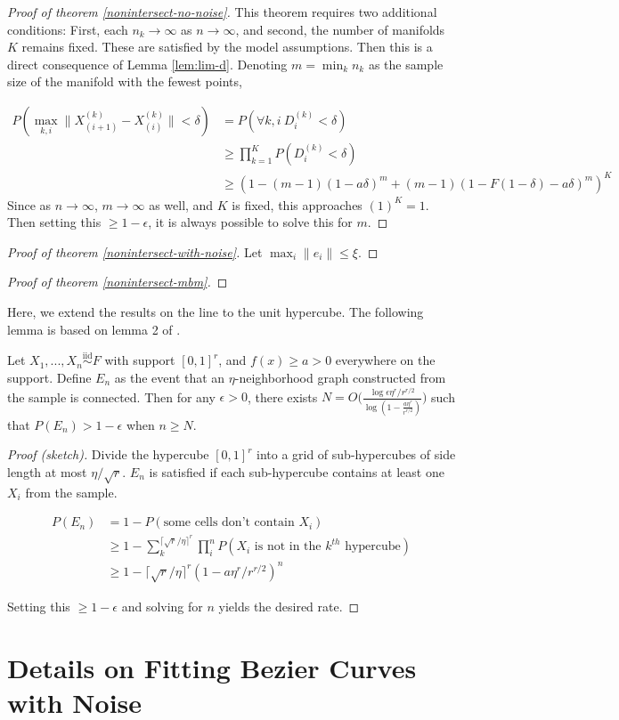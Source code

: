 \documentclass[12pt]{article}
\begin{document}
\begin{proof}[Proof of theorem \ref{nonintersect-no-noise}]
This theorem requires two additional conditions: 
First, each $n_k \to \infty$ as $n \to \infty$, and second, the number of manifolds $K$ remains fixed. 
These are satisfied by the model assumptions. 
Then this is a direct consequence of Lemma \ref{lem:lim-d}. 
Denoting $m = \min_k n_k$ as the sample size of the manifold with the fewest points, 

$$
\begin{aligned}
P(\max_{k,i} \|X_{(i+1)}^{(k)} - X_{(i)}^{(k)}\| < \delta) & = P(\forall k, i ~ D_i^{(k)} < \delta) \\
& \geq \prod_{k=1}^K P(D_i^{(k)} < \delta) \\
& \geq (1 - (m-1) (1 - a \delta)^{m} + (m-1) (1 - F(1-\delta) - a \delta)^{m})^K
\end{aligned}
$$
Since as $n \to \infty$, $m \to \infty$ as well, and $K$ is fixed, this approaches $(1)^K = 1$. Then setting this $\geq 1 - \epsilon$, it is always possible to solve this for $m$. 
\end{proof}

\begin{proof}[Proof of theorem \ref{nonintersect-with-noise}]
Let $\max_i \|e_i\| \leq \xi$. 
\end{proof}

\begin{proof}[Proof of theorem \ref{nonintersect-mbm}]
\end{proof}

Here, we extend the results on the line to the unit hypercube. The
following lemma is based on lemma 2 of
\citet{trosset2020rehabilitating}.

\begin{lemma}
\label{thm:multidim}
Let $X_1, ..., X_n \stackrel{\mathrm{iid}}{\sim}F$ with support $[0, 1]^r$, and $f(x) \geq a > 0$ everywhere on the support. 
Define $E_n$ as the event that an $\eta$-neighborhood graph constructed from the sample is connected. 
Then for any $\epsilon > 0$, there exists $N = O \bigg( \frac{\log \epsilon \eta^r / r^{r/2}}{\log (1 - \frac{a \eta^r}{r^{r / 2}})} \bigg)$ such that $P(E_n) > 1 - \epsilon$ when $n \geq N$.
\end{lemma}

\begin{proof}[Proof (sketch)]
Divide the hypercube $[0, 1]^r$ into a grid of sub-hypercubes of side length at most $\eta / \sqrt{r}$. 
$E_n$ is satisfied if each sub-hypercube contains at least one $X_i$ from the sample. 

$$
\begin{aligned}
P(E_n) & = 1 - P(\text{some cells don't contain } X_i) \\
& \geq 1 - \sum_k^{\lceil \sqrt{r} / \eta \rceil^r} \prod_i^n P(X_i \text{ is not in the } k^{th} \text{ hypercube}) \\
& \geq 1 - \lceil \sqrt{r} / \eta \rceil^r (1 - a \eta^r / r^{r/2})^n
\end{aligned}
$$

Setting this $\geq 1 - \epsilon$ and solving for $n$ yields the desired rate. 
\end{proof}

\section{Details on Fitting Bezier Curves with Noise}



\end{document}
